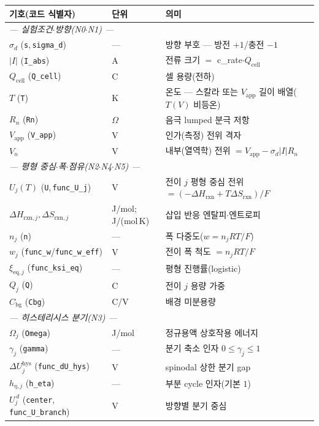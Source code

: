 \documentclass[11pt,a4paper]{article}
\newcommand{\eq}{\mathrm{eq}}
\newcommand{\app}{\mathrm{app}}
\newcommand{\cell}{\mathrm{cell}}
\newcommand{\bg}{\mathrm{bg}}
\newcommand{\rxn}{\mathrm{rxn}}
\newcommand{\hys}{\mathrm{hys}}
\newcommand{\code}[1]{\texttt{#1}}
\begin{document}
\begin{longtable}{p{} p{} p{}}
\toprule 기호(코드 식별자) & 단위 & 의미 \\ \midrule \endhead
\multicolumn{3}{l}{\emph{— 실험조건$\cdot$방향(N0$\cdot$N1) —}}\\
$\sigma_d$ (\code{s},\,\code{sigma\_d}) & --- & 방향 부호 — 방전 $+1$/충전 $-1$ \\
$|I|$ (\code{I\_abs}) & A & 전류 크기 $=$ c\_rate$\cdot Q_\cell$ \\
$Q_\cell$ (\code{Q\_cell}) & C & 셀 용량(전하) \\
$T$ (\code{T}) & K & 온도 — 스칼라 또는 $V_\app$ 길이 배열($T(V)$ 비등온) \\
$R_n$ (\code{Rn}) & $\Omega$ & 음극 lumped 분극 저항 \\
$V_\app$ (\code{V\_app}) & V & 인가(측정) 전위 격자 \\
$V_n$ & V & 내부(열역학) 전위 $=V_\app-\sigma_d|I|R_n$ \\
\multicolumn{3}{l}{\emph{— 평형 중심$\cdot$폭$\cdot$점유(N2$\cdot$N4$\cdot$N5) —}}\\
$U_j(T)$ (\code{U},\,\code{func\_U\_j}) & V & 전이 $j$ 평형 중심 전위 $=(-\Delta H_\rxn+T\Delta S_\rxn)/F$ \\
$\Delta H_{\rxn,j},\Delta S_{\rxn,j}$ & {\footnotesize J/mol;\,J/(mol\,K)} & 삽입 반응 엔탈피$\cdot$엔트로피 \\
$n_j$ (\code{n}) & --- & 폭 다중도($w=n_jRT/F$) \\
$w_j$ (\code{func\_w}/\code{func\_w\_eff}) & V & 전이 폭 척도 $=n_jRT/F$ \\
$\xi_{\eq,j}$ (\code{func\_ksi\_eq}) & --- & 평형 진행률(logistic) \\
$Q_j$ (\code{Q}) & C & 전이 $j$ 용량 가중 \\
$C_\bg$ (\code{Cbg}) & C/V & 배경 미분용량 \\
\multicolumn{3}{l}{\emph{— 히스테리시스 분기(N3) —}}\\
$\Omega_j$ (\code{Omega}) & J/mol & 정규용액 상호작용 에너지 \\
$\gamma_j$ (\code{gamma}) & --- & 분기 축소 인자 $0\le\gamma_j\le1$ \\
$\Delta U_j^\hys$ (\code{func\_dU\_hys}) & V & spinodal 상한 분기 gap \\
$h_{\eta,j}$ (\code{h\_eta}) & --- & 부분 cycle 인자(기본 $1$) \\
$U_j^{\,d}$ (\code{center},\,\code{func\_U\_branch}) & V & 방향별 분기 중심 \\

\end{longtable}
\end{document}
